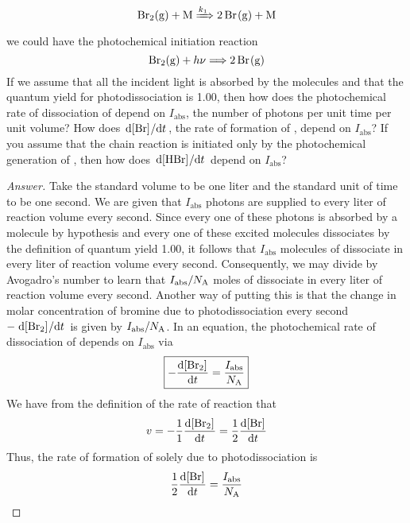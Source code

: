 \documentclass[../psets.tex]{subfiles}
\begin{document}
\begin{enumerate}[label={\textbf{29-\arabic*.}},leftmargin=3.5em]
    \begin{equation*}
        \ce{Br2(g) + M} \xRightarrow{k_1} \ce{2Br(g) + M}
    \end{equation*}
    we could have the photochemical initiation reaction
    \begin{equation*}
        \ce{Br2(g) + $h\nu$} \Longrightarrow \ce{2Br(g)}
    \end{equation*}
    If we assume that all the incident light is absorbed by the  molecules and that the quantum yield for photodissociation is 1.00, then how does the photochemical rate of dissociation of  depend on $I_\text{abs}$, the number of photons per unit time per unit volume? How does $\dv*{\cnc{Br}}{t}$, the rate of formation of , depend on $I_\text{abs}$? If you assume that the chain reaction is initiated only by the photochemical generation of , then how does $\dv*{\cnc{HBr}}{t}$ depend on $I_\text{abs}$?
    \begin{proof}[Answer]
        Take the standard volume to be one liter and the standard unit of time to be one second. We are given that $I_\text{abs}$ photons are supplied to every liter of reaction volume every second. Since every one of these photons is absorbed by a  molecule by hypothesis and every one of these excited  molecules dissociates by the definition of quantum yield 1.00, it follows that $I_\text{abs}$ molecules of  dissociate in every liter of reaction volume every second. Consequently, we may divide by Avogadro's number to learn that $I_\text{abs}/N_\text{A}$ moles of  dissociate in every liter of reaction volume every second. Another way of putting this is that the change in molar concentration of bromine due to photodissociation every second $-\dv*{\cnc{Br2}}{t}$ is given by $I_\text{abs}/N_\text{A}$. In an equation, the photochemical rate of dissociation of  depends on $I_\text{abs}$ via
        \begin{equation*}
            \boxed{-\dv{\cnc{Br2}}{t} = \frac{I_\text{abs}}{\NA}}
        \end{equation*}
        We have from the definition of the rate of reaction that
        \begin{equation*}
            v = -\frac{1}{1}\dv{\cnc{Br2}}{t}
            = \frac{1}{2}\dv{\cnc{Br}}{t}
        \end{equation*}
        Thus, the rate of formation of  solely due to photodissociation is
        \begin{align*}
            \frac{1}{2}\dv{\cnc{Br}}{t} &= \frac{I_\text{abs}}{\NA}\\

\end{align*}
\end{proof}
\end{enumerate}
\end{document}

